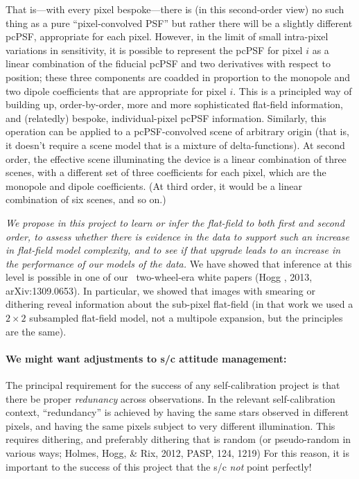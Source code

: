\documentclass[12pt,preprint]{aastex}
\begin{document}
That is---with every pixel bespoke---there is
(in this second-order view) no such thing as a pure ``pixel-convolved PSF'' but
rather there will be a slightly different pcPSF,
appropriate for each pixel.
However, in the limit of small intra-pixel variations in sensitivity,
it is possible to represent the pcPSF for pixel $i$ as a
linear combination of the fiducial pcPSF and two
derivatives with respect to position; these three components are
coadded in proportion to the monopole and two dipole coefficients
that are appropriate for pixel $i$.
This is a principled way of building up, order-by-order, more and more
sophisticated flat-field information, and (relatedly) bespoke,
 individual-pixel pcPSF information.
Similarly, this operation can be applied to a pcPSF-convolved scene of
arbitrary origin (that is, it doesn't require a scene model that is
a mixture of delta-functions).
At second order, the effective scene illuminating the device is a
linear combination of three scenes, with a different set of three
coefficients for each pixel, which are the monopole and dipole
coefficients.
(At third order, it would be a linear combination of six scenes, and
so on.)

\emph{We propose in this project to learn or infer the flat-field to both first and second
order, to assess whether there is evidence in the data to support such
an increase in flat-field model complexity, and to see if that upgrade
leads to an increase in the performance of our models of the data.}
We have showed that inference at this level is possible in one of our
\kepler\ two-wheel-era white papers (Hogg \etal, 2013, arXiv:1309.0653).
In particular, we showed that images with smearing or dithering reveal
information about the sub-pixel flat-field (in that work we used a
$2\times 2$ subsampled flat-field model, not a multipole expansion,
but the principles are the same).

\paragraph{We might want adjustments to s/c attitude management:}

The principal requirement for the success of any self-calibration project
is that there be proper \emph{redunancy} across observations.
In the relevant self-calibration context, ``redundancy'' is achieved
by having the same stars observed in different pixels, and having the
same pixels subject to very different illumination.
This requires dithering, and preferably dithering that is random (or
pseudo-random in various ways; Holmes, Hogg, \& Rix, 2012, PASP, 124,
1219)
For this reason, it is important to the success of this project that
the s/c \emph{not} point perfectly!
\end{document}
